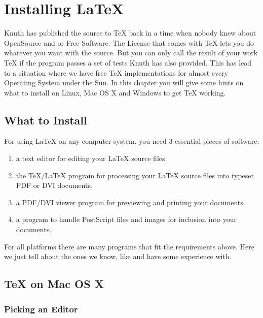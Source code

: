 \appendix
\chapter{Installing \LaTeX}
\begin{intro}
Knuth has published the source to \TeX{} back in a time when nobody knew
about OpenSource and or Free Software. The License that comes with \TeX{}
lets you do whatever you want with the source. But you can only call the
result of your work \TeX{} if the program passes a set of tests Knuth has
also provided. This has lead to a situation where we have free \TeX{}
implementations for almost every Operating System under the Sun. In this chapter
you will give some hints on what to install on Linux, Mac OS X and Windows to
get \TeX{} working.
\end{intro}

\section{What to Install}

For using LaTeX on any computer system, you need 3 essential pieces of
software:

\begin{enumerate}

\item a text editor for editing your LaTeX source files.

\item the \TeX{}/\LaTeX{} program for processing your \LaTeX{} source files
into typeset PDF or DVI documents.

\item a PDF/DVI viewer program for previewing and printing your
documents.

\item a program to handle PostScript files and images for inclusion into
your documents.

\end{enumerate}

For all platforms there are many programs that fit the requirements above.
Here we just tell about the ones we know, like and have some experience
with.

\section{\TeX{} on Mac OS X}

\subsection{Picking an Editor}

